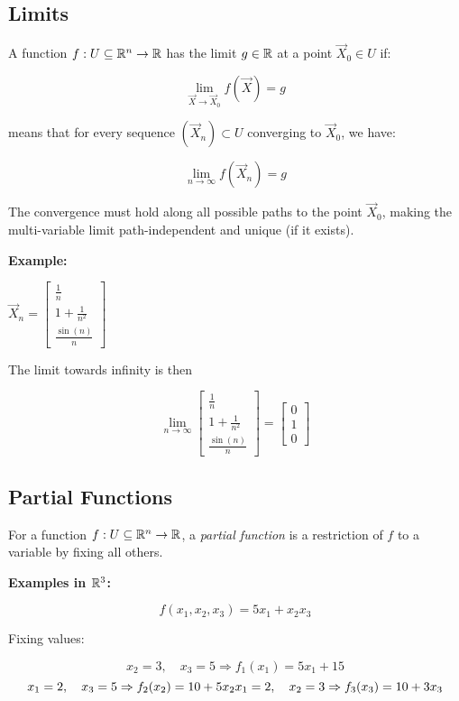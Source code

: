 \subsection{Limits}

A function \( f : U \subseteq \mathbb{R}^n \to \mathbb{R} \) has the limit \( g \in \mathbb{R} \) at a 
point \( \vec{X}_0 \in U \) if:

\[
    \lim_{\vec{X} \to \vec{X}_0} f(\vec{X}) = g
\]

means that for every sequence \( (\vec{X}_n) \subset U \) converging to \( \vec{X}_0 \), we have:

\[
    \lim_{n \to \infty} f(\vec{X}_n) = g
\]

The convergence must hold along all possible paths to the point \( \vec{X}_0 \), making the 
multi-variable limit path-independent and unique (if it exists).

\textbf{Example:}

\(\vec{X}_n = \begin{bmatrix} \frac{1}{n} \\ 1 + \frac{1}{n^2} \\ \frac{\sin(n)}{n} \end{bmatrix}\)

The limit towards infinity is then 

\[
    \lim_{n \to \infty} \begin{bmatrix} \frac{1}{n} \\ 1 + \frac{1}{n^2} \\ \frac{\sin(n)}{n} \end{bmatrix}
    = \begin{bmatrix}
        0 \\ 1 \\ 0
    \end{bmatrix}
\]

\subsection{Partial Functions}

For a function \( f: U \subseteq \mathbb{R}^n \to \mathbb{R} \), a \emph{partial function} is a 
restriction of \(f\) to a variable by fixing all others.

\textbf{Examples in \( \mathbb{R}^3 \):}

\[
    f(x_1, x_2, x_3) = 5x_1 + x_2 x_3
\]

Fixing values:

\[
    x_2 = 3, \quad x_3 = 5 \Rightarrow f_1(x_1) = 5x_1 + 15 
\]
\[
    x_1 = 2, \quad x_3 = 5 \Rightarrow f_2(x_2) = 10 + 5x_2 \\
    x_1 = 2, \quad x_2 = 3 \Rightarrow f_3(x_3) = 10 + 3x_3
\]

